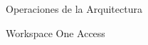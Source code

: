 \begin{subsection}{Operaciones de la Arquitectura}
\begin{subsubsection}{Workspace One Access}


    \end{subsubsection}


\end{subsection}
